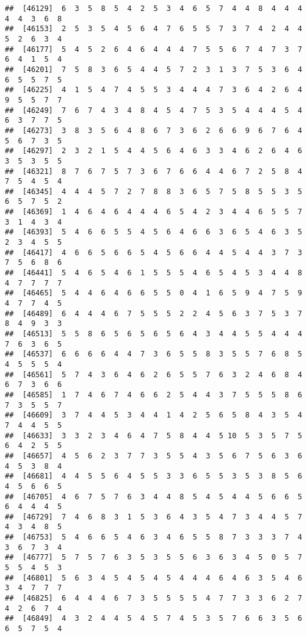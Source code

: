 \documentclass[
]{book}
\begin{document}
\begin{verbatim}
##  [46129]  6  3  5  8  5  4  2  5  3  4  6  5  7  4  4  8  4  4  4  4  4  3  6  8
##  [46153]  2  5  3  5  4  5  6  4  7  6  5  5  7  3  7  4  2  4  4  5  2  6  3  4
##  [46177]  5  4  5  2  6  4  6  4  4  4  7  5  5  6  7  4  7  3  7  6  4  1  5  4
##  [46201]  7  5  8  3  6  5  4  4  5  7  2  3  1  3  7  5  3  6  4  6  5  5  7  5
##  [46225]  4  1  5  4  7  4  5  5  3  4  4  4  7  3  6  4  2  6  4  9  5  5  7  7
##  [46249]  7  6  7  4  3  4  8  4  5  4  7  5  3  5  4  4  4  5  4  6  3  7  7  5
##  [46273]  3  8  3  5  6  4  8  6  7  3  6  2  6  6  9  6  7  6  4  5  6  7  3  5
##  [46297]  2  3  2  1  5  4  4  5  6  4  6  3  3  4  6  2  6  4  6  3  5  3  5  5
##  [46321]  8  7  6  7  5  7  3  6  7  6  6  4  4  6  7  2  5  8  4  7  5  4  5  4
##  [46345]  4  4  4  5  7  2  7  8  8  3  6  5  7  5  8  5  5  3  5  6  5  7  5  2
##  [46369]  1  4  6  4  6  4  4  4  6  5  4  2  3  4  4  6  5  5  7  3  1  4  3  4
##  [46393]  5  4  6  6  5  5  4  5  6  4  6  6  3  6  5  4  6  3  5  2  3  4  5  5
##  [46417]  4  6  6  5  6  6  5  4  5  6  6  4  4  5  4  4  3  7  3  7  5  6  8  6
##  [46441]  5  4  6  5  4  6  1  5  5  5  4  6  5  4  5  3  4  4  8  4  7  7  7  7
##  [46465]  5  4  4  6  4  6  6  5  5  0  4  1  6  5  9  4  7  5  9  4  7  7  4  5
##  [46489]  6  4  4  4  6  7  5  5  5  2  2  4  5  6  3  7  5  3  7  8  4  9  3  3
##  [46513]  5  5  8  6  5  6  5  6  5  6  4  3  4  4  5  5  4  4  4  7  6  3  6  5
##  [46537]  6  6  6  6  4  4  7  3  6  5  5  8  3  5  5  7  6  8  5  4  5  5  5  4
##  [46561]  5  7  4  3  6  4  6  2  6  5  5  7  6  3  2  4  6  8  4  6  7  3  6  6
##  [46585]  1  7  4  6  7  4  6  6  2  5  4  4  3  7  5  5  5  8  6  7  3  5  5  7
##  [46609]  3  7  4  4  5  3  4  4  1  4  2  5  6  5  8  4  3  5  4  7  4  4  5  5
##  [46633]  3  3  2  3  4  6  4  7  5  8  4  4  5 10  5  3  5  7  5  6  4  2  5  5
##  [46657]  4  5  6  2  3  7  7  3  5  5  4  3  5  6  7  5  6  3  6  4  5  3  8  4
##  [46681]  4  4  5  5  6  4  5  5  3  3  6  5  5  3  5  3  8  5  6  4  5  6  6  5
##  [46705]  4  6  7  5  7  6  3  4  4  8  5  4  5  4  4  5  6  6  5  6  4  4  4  5
##  [46729]  7  4  6  8  3  1  5  3  6  4  3  5  4  7  3  4  4  5  7  4  3  4  8  5
##  [46753]  5  4  6  6  5  4  6  3  4  6  5  5  8  7  3  3  3  7  4  3  6  7  3  4
##  [46777]  5  7  5  7  6  3  5  3  5  5  6  3  6  3  4  5  0  5  7  5  5  4  5  3
##  [46801]  5  6  3  4  5  4  5  4  5  4  4  4  6  4  6  3  5  4  6  3  4  7  7  7
##  [46825]  6  4  4  4  6  7  3  5  5  5  5  4  7  7  3  3  6  2  7  4  2  6  7  4
##  [46849]  4  3  2  4  4  5  4  5  7  4  5  3  5  7  6  6  3  5  6  6  5  7  5  4

\end{verbatim}
\end{document}
